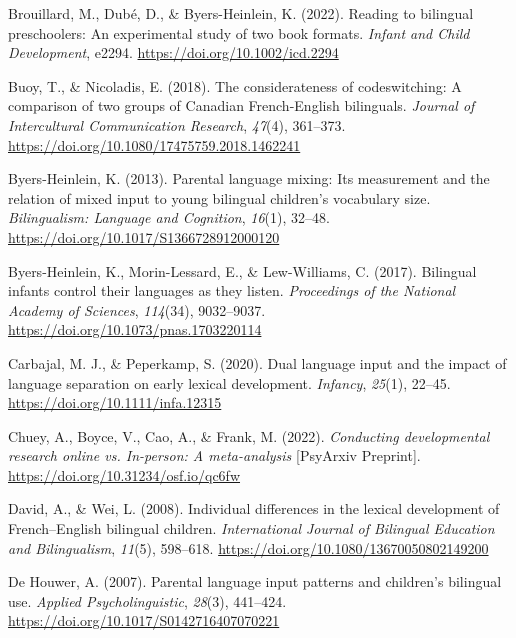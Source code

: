 \documentclass[
  man,floatsintext]{apa7}
\newlength{\cslhangindent}
\newlength{\cslentryspacingunit} %
\newenvironment{CSLReferences}[2] %
 {%
  \setlength{\parindent}{0pt}
  \ifodd #1
  \let\oldpar\par
  \def\par{\hangindent=\cslhangindent\oldpar}
  \fi
  \setlength{\parskip}{#2\cslentryspacingunit}
 }%
 {}
\begin{document}
\begin{CSLReferences}{1}{0}
\leavevmode{}%
Brouillard, M., Dubé, D., \& Byers-Heinlein, K. (2022). Reading to bilingual preschoolers: An experimental study of two book formats. \emph{Infant and Child Development}, e2294. \url{https://doi.org/10.1002/icd.2294}

\leavevmode{}%
Buoy, T., \& Nicoladis, E. (2018). The considerateness of codeswitching: A comparison of two groups of {Canadian French-English} bilinguals. \emph{Journal of Intercultural Communication Research}, \emph{47}(4), 361--373. \url{https://doi.org/10.1080/17475759.2018.1462241}

\leavevmode{}%
Byers-Heinlein, K. (2013). Parental language mixing: Its measurement and the relation of mixed input to young bilingual children's vocabulary size. \emph{Bilingualism: Language and Cognition}, \emph{16}(1), 32--48. \url{https://doi.org/10.1017/S1366728912000120}

\leavevmode{}%
Byers-Heinlein, K., Morin-Lessard, E., \& Lew-Williams, C. (2017). Bilingual infants control their languages as they listen. \emph{Proceedings of the National Academy of Sciences}, \emph{114}(34), 9032--9037. \url{https://doi.org/10.1073/pnas.1703220114}

\leavevmode{}%
Carbajal, M. J., \& Peperkamp, S. (2020). Dual language input and the impact of language separation on early lexical development. \emph{Infancy}, \emph{25}(1), 22--45. \url{https://doi.org/10.1111/infa.12315}

\leavevmode{}%
Chuey, A., Boyce, V., Cao, A., \& Frank, M. (2022). \emph{Conducting developmental research online vs. In-person: A meta-analysis} {[}PsyArxiv Preprint{]}. \url{https://doi.org/10.31234/osf.io/qc6fw}

\leavevmode{}%
David, A., \& Wei, L. (2008). Individual differences in the lexical development of {F}rench--{E}nglish bilingual children. \emph{International Journal of Bilingual Education and Bilingualism}, \emph{11}(5), 598--618. \url{https://doi.org/10.1080/13670050802149200}

\leavevmode{}%
De Houwer, A. (2007). Parental language input patterns and children's bilingual use. \emph{Applied Psycholinguistic}, \emph{28}(3), 441--424. \url{https://doi.org/10.1017/S0142716407070221}


\end{CSLReferences}
\end{document}
